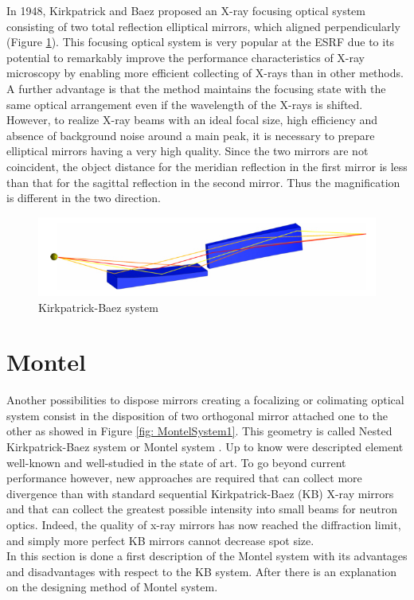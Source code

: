 \hspace{10mm} In 1948, Kirkpatrick and Baez proposed an X-ray focusing optical system consisting of two total reflection elliptical mirrors, which aligned perpendicularly (Figure \ref{fig: KirckPatrick Baez System}). This focusing optical system is very popular at the ESRF due to its potential to remarkably improve the performance characteristics of X-ray microscopy by enabling more efficient collecting of X-rays than in other methods. A further advantage is that the method maintains the focusing state with the same optical arrangement even if the wavelength of the X-rays is shifted. However, to realize X-ray beams with an ideal focal size, high efficiency and absence of background noise around a main peak, it is necessary to prepare elliptical mirrors having a very high quality. Since the two mirrors are not coincident, the object distance for the meridian reflection in the first mirror is less than that for the sagittal reflection in the second mirror. Thus the magnification is different in the two direction.
\begin{figure}[H]
%
\centering
%
\includegraphics[width=.6\textwidth]{Immagini/Chapter2/KBSystem}
%
\caption{Kirkpatrick-Baez system}
%
\label{fig: KirckPatrick Baez System}
%
\end{figure}


\section{Montel}
Another possibilities to dispose mirrors creating a focalizing or colimating optical system consist in the disposition of two orthogonal mirror attached one to the other as showed in Figure \ref{fig: MontelSystem1}. This geometry is called Nested Kirkpatrick-Baez system or Montel system \cite{montel1957x}. Up to know were descripted element well-known and well-studied in the state of art. To go beyond current performance however, new approaches are required that can collect more divergence than with standard sequential Kirkpatrick-Baez (KB) X-ray mirrors and that can collect the greatest possible intensity into small beams for neutron optics. Indeed, the quality of x-ray mirrors has now reached the diffraction limit, and simply more perfect KB mirrors cannot decrease spot size.
\\
In this section is done a first description of the Montel system with its advantages and disadvantages with respect to the KB system. After there is an explanation on the designing method of Montel system.  

